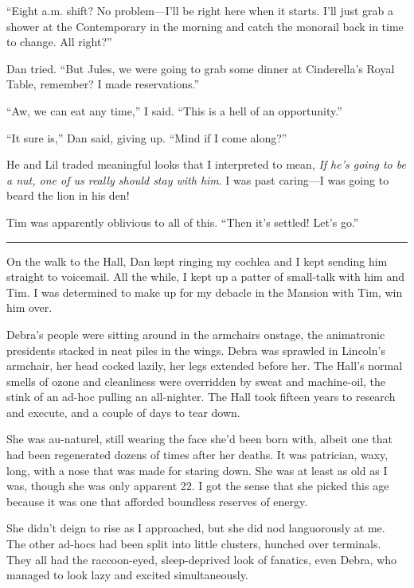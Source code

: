 “Eight a.m. shift? No problem—I'll be right here when it starts.
I'll just grab a shower at the Contemporary in the morning and
catch the monorail back in time to change. All right?”

Dan tried. “But Jules, we were going to grab some dinner at
Cinderella's Royal Table, remember? I made reservations.”

“Aw, we can eat any time,” I said. “This is a hell of an
opportunity.”

“It sure is,” Dan said, giving up. “Mind if I come along?”

He and Lil traded meaningful looks that I interpreted to mean,
\emph{If he's going to be a nut, one of us really should stay with him}.
I was past caring—I was going to beard the lion in his den!

Tim was apparently oblivious to all of this. “Then it's settled!
Let's go.”

\begin{center}\rule{3in}{0.4pt}\end{center}

On the walk to the Hall, Dan kept ringing my cochlea and I kept
sending him straight to voicemail. All the while, I kept up a
patter of small-talk with him and Tim. I was determined to make up
for my debacle in the Mansion with Tim, win him over.

Debra's people were sitting around in the armchairs onstage, the
animatronic presidents stacked in neat piles in the wings. Debra
was sprawled in Lincoln's armchair, her head cocked lazily, her
legs extended before her. The Hall's normal smells of ozone and
cleanliness were overridden by sweat and machine-oil, the stink of
an ad-hoc pulling an all-nighter. The Hall took fifteen years to
research and execute, and a couple of days to tear down.

She was au-naturel, still wearing the face she'd been born with,
albeit one that had been regenerated dozens of times after her
deaths. It was patrician, waxy, long, with a nose that was made for
staring down. She was at least as old as I was, though she was only
apparent 22. I got the sense that she picked this age because it
was one that afforded boundless reserves of energy.

She didn't deign to rise as I approached, but she did nod
languorously at me. The other ad-hocs had been split into little
clusters, hunched over terminals. They all had the raccoon-eyed,
sleep-deprived look of fanatics, even Debra, who managed to look
lazy and excited simultaneously.

